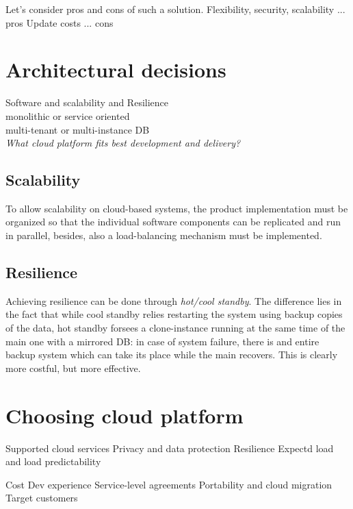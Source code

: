 Let's consider pros and cons of such a solution.
Flexibility, security, scalability ... pros
Update costs ... cons

\section{Architectural decisions}
Software and scalability and Resilience\\
monolithic or service oriented\\
multi-tenant or multi-instance DB\\
\textit{What cloud platform fits best development and delivery?}

\subsection{Scalability}
To allow scalability on cloud-based systems,
the product implementation must be organized so that the individual software components can be replicated and run in parallel,
besides, also a load-balancing mechanism must be implemented.

\subsection{Resilience}
Achieving resilience can be done through \textit{hot/cool standby}.
The difference lies in the fact that while cool standby relies restarting the system using backup copies of the data,
hot standby forsees a clone-instance running at the same time of the main one with a mirrored DB:
in case of system failure,
there is and entire backup system which can take its place while the main recovers.
This is clearly more costful, but more effective.

\section{Choosing cloud platform}
Supported cloud services
Privacy and data protection
Resilience
Expectd load and load predictability

Cost
Dev experience
Service-level agreements
Portability and cloud migration
Target customers

